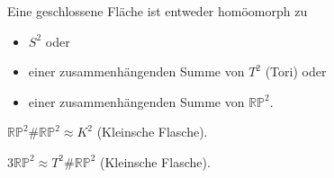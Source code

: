\begin{satz}
Eine geschlossene Fläche ist entweder homöomorph zu
\begin{itemize}
	\item $S^2$ oder
	\item einer zusammenhängenden Summe von $T^2$ (Tori) oder
	\item einer zusammenhängenden Summe von $\mathbb{RP}^2$.
\end{itemize}
\end{satz}

\begin{lemma}
$\mathbb{RP}^2 \# \mathbb{RP}^2 \approx K^2$ (Kleinsche Flasche).
\end{lemma}

\begin{lemma}
$3 \mathbb{RP}^2 \approx T^2 \# \mathbb{RP}^2 $ (Kleinsche Flasche).
\end{lemma}